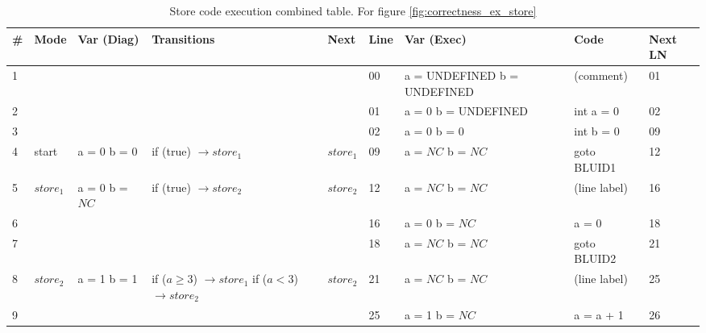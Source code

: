 \begin{table}[htcb]
	\caption{Store code execution combined table. For figure \ref{fig:correctness_ex_store}}
	\centering
	\tablefontsize
		\begin{tabular}{|p{} | p{} | p{} | p{} | p{} | p{} | p{} | p{} | p{} |}
			\hline
			\textbf{\#} & \textbf{Mode} 		&	\textbf{Var (Diag)} 		& 	\textbf{Transitions} 		& 	\textbf{Next}		&	\textbf{Line}		&	\textbf{Var (Exec)	}	&	\textbf{Code}	&	\textbf{Next LN} \\
			\hline			
			1&					&								&								&						&	00					& 	a = UNDEFINED \newline	b = UNDEFINED	&	(comment)		&	01	\\
			\hline
			2&					&								&								&						&	01					&	a = 0 \newline b = UNDEFINED	&	int a = 0				&	02	\\
			\hline
			3&					&								&								&						&	02					&	a = 0 \newline b = 0		&	int b = 0					& 	09	\\
			\hline
			4&start				&	a = 0 \newline b = 0		&	if (true) $\rightarrow store_1$	& $store_1$			&	09					&	a = $NC$ \newline b = $NC$	&	goto BLUID1					&	12	\\
			\hline
			5&$store_1$			&	a = 0 \newline b = $NC$		&	if (true) $\rightarrow store_2$ & $store_2$			&	12					&	a = $NC$ \newline b = $NC$	&	(line label)				&	16	\\
			\hline
			6&					&								&								&						&	16					&	a = 0 \newline b = $NC$		&	a = 0						&	18	\\
			\hline
			7&					&								&								&						&	18					&	a = $NC$ \newline b = $NC$	&	goto BLUID2					&	21	\\
			\hline	
			8&$store_2$			&	a = 1	\newline b = 1		&	if ($a \geq 3$) $\rightarrow store_1$ \newline
																	if ($a < 3$) $\rightarrow store_2$ &	$store_2$	&	21					&	a = $NC$ \newline b = $NC$	&	(line label)				&	25	\\
			\hline
			9&					&								&								&						&	25					&	a = 1 \newline b = $NC$		&		a = a + 1				&	26	\\

\end{tabular}
\end{table}
